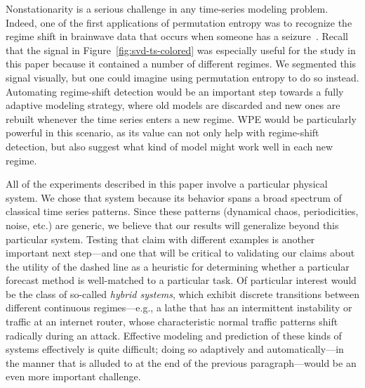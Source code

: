 Nonstationarity is a serious challenge in any time-series modeling
problem.  Indeed, one of the first applications of permutation entropy
was to recognize the regime shift in brainwave data that occurs when
someone has a seizure~\cite{cao2004det}.  Recall that the signal in
Figure~\ref{fig:svd-ts-colored} was especially useful for the study in
this paper because it contained a number of different regimes.  We
segmented this signal visually, but one could imagine using
permutation entropy to do so instead.  Automating regime-shift
detection would be an important step towards a fully adaptive modeling
strategy, where old models are discarded and new ones are rebuilt
whenever the time series enters a new regime.  WPE would be
particularly powerful in this scenario, as its value can not only help
with regime-shift detection, but also suggest what kind of model might
work well in each new regime.

All of the experiments described in this paper involve a particular
physical system.  We chose that system because its behavior spans a
broad spectrum of classical time series patterns.  Since these
patterns (dynamical chaos, periodicities, noise, etc.) are generic, we
believe that our results will generalize beyond this particular
system.  Testing that claim with different examples is another
important next step---and one that will be critical to validating our
claims about the utility of the dashed line as a heuristic for
determining whether a particular forecast method is well-matched to a
particular task.  Of particular interest would be the class of
so-called \emph{hybrid systems}, which exhibit discrete transitions
between different continuous regimes---e.g., a lathe that has an
intermittent instability or traffic at an internet router, whose
characteristic normal traffic patterns shift radically during an
attack.  Effective modeling and prediction of these kinds of systems
effectively is quite difficult; doing so adaptively and
automatically---in the manner that is alluded to at the end of the
previous paragraph---would be an even more important challenge.

